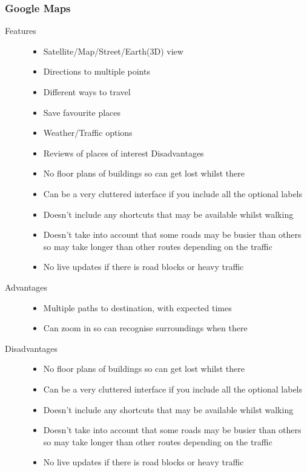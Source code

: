\documentclass[10pt,a4paper,oneside]{report}
\begin{document}
\subsubsection*{Google Maps}
\begin{description}
\item[Features]{ \hfill
\begin{itemize}
\item{Satellite/Map/Street/Earth(3D) view}
\item{Directions to multiple points}
\item{Different ways to travel}
\item{Save favourite places}
\item{Weather/Traffic options}
\item{Reviews of places of interest	Disadvantages}
\item{No floor plans of buildings so can get lost whilst there}
\item{Can be a very cluttered interface if you include all the optional labels}
\item{Doesn't include any shortcuts that may be available whilst walking}
\item{Doesn't take into account that some roads may be busier than others so may take longer than other routes depending on the traffic}
\item{No live updates if there is road blocks or heavy traffic}
\end{itemize}}
\item[Advantages]{ \hfill
\begin{itemize}
\item{Multiple paths to destination, with expected times}
\item{Can zoom in so can recognise surroundings when there}
\end{itemize}}

\item[Disadvantages]{ \hfill
\begin{itemize}
\item{No floor plans of buildings so can get lost whilst there}
\item{Can be a very cluttered interface if you include all the optional labels}
\item{Doesn't include any shortcuts that may be available whilst walking}
\item{Doesn't take into account that some roads may be busier than others so may take longer than other routes depending on the traffic}
\item{No live updates if there is road blocks or heavy traffic}
\end{itemize}}
\end{description}
\end{document}
